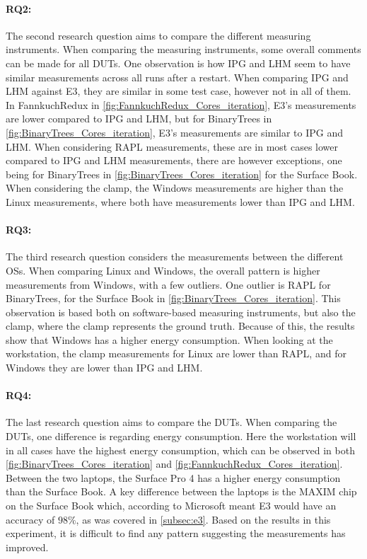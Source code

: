 \paragraph*{RQ2:} The second research question aims to compare the different measuring instruments. When comparing the measuring instruments, some overall comments can be made for all DUTs. One observation is how IPG and LHM seem to have similar measurements across all runs after a restart. When comparing IPG and LHM against E3, they are similar in some test case, however not in all of them. In FannkuchRedux in \cref{fig:FannkuchRedux_Cores_iteration}, E3's measurements are lower compared to IPG and LHM, but for BinaryTrees in \cref{fig:BinaryTrees_Cores_iteration}, E3's measurements are similar to IPG and LHM. When considering RAPL measurements, these are in most cases lower compared to IPG and LHM measurements, there are however exceptions, one being for BinaryTrees in \cref{fig:BinaryTrees_Cores_iteration} for the Surface Book. When considering the clamp, the Windows measurements are higher than the Linux measurements, where both have measurements lower than IPG and LHM. 



\paragraph*{RQ3:} The third research question considers the measurements between the different OSs. When comparing Linux and Windows, the overall pattern is higher measurements from Windows, with a few outliers. One outlier is RAPL for BinaryTrees, for the Surface Book in \cref{fig:BinaryTrees_Cores_iteration}. This observation is based both on software-based measuring instruments, but also the clamp, where the clamp represents the ground truth. Because of this, the results show that Windows has a higher energy consumption. When looking at the workstation, the clamp measurements for Linux are lower than RAPL, and for Windows they are lower than IPG and LHM.

\paragraph*{RQ4:} The last research question aims to compare the DUTs. When comparing the DUTs, one difference is regarding energy consumption. Here the workstation will in all cases have the highest energy consumption, which can be observed in both \cref{fig:BinaryTrees_Cores_iteration} and \cref{fig:FannkuchRedux_Cores_iteration}. Between the two laptops, the Surface Pro 4 has a higher energy consumption than the Surface Book. A key difference between the laptops is the MAXIM chip on the Surface Book which, according to Microsoft meant E3 would have an accuracy of $98\%$\cite{E3WinHec}, as was covered in \cref{subsec:e3}. Based on the results in this experiment, it is difficult to find any pattern suggesting the measurements has improved.
